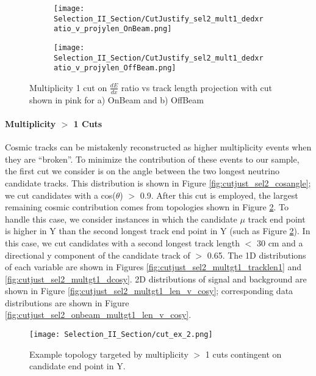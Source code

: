 \begin{figure}[t!]
\centering
\begin{subfigure}[t]{0.25\textwidth}
  \centering
  \texttt{[image: Selection\_II\_Section/CutJustify\_sel2\_mult1\_dedxratio\_v\_projylen\_OnBeam.png]}  
  \caption{ }
  \end{subfigure} 
  \hspace{1 mm}
  \begin{subfigure}[t]{0.25\textwidth}
    \centering
\texttt{[image: Selection\_II\_Section/CutJustify\_sel2\_mult1\_dedxratio\_v\_projylen\_OffBeam.png]}
  \caption{ }
  \end{subfigure} 
\caption{Multiplicity 1 cut on $\frac{dE}{dx}$ ratio vs track length projection with cut shown in pink for a) OnBeam and b) OffBeam }
\label{fig:cutjust_sel2_onbeam_mult1_dedxratio_v_leny}

\end{figure}

\clearpage
\paragraph{Multiplicity $>$ 1 Cuts}
Cosmic tracks can be mistakenly reconstructed as higher multiplicity events when they are ``broken''. To minimize the contribution of these events to our sample, the first cut we consider is on the angle between the two longest neutrino candidate tracks.  This distribution is shown in Figure \ref{fig:cutjust_sel2_cosangle}; we cut candidates with a cos($\theta$) $>$ 0.9.  After this cut is employed, the largest remaining cosmic contribution comes from topologies shown in Figure \ref{fig:cut_ex_2}.  To handle this case, we consider instances in which the candidate $\mu$ track end point is higher in Y than the second longest track end point in Y (such as Figure \ref{fig:cut_ex_2}).  In this case, we cut candidates with a second longest track length $<$ 30 cm and a directional y component of the candidate track of $>$ 0.65. The 1D distributions of each variable are shown in Figures \ref{fig:cutjust_sel2_multgt1_tracklen1} and \ref{fig:cutjust_sel2_multgt1_dcosy}.  2D distributions of signal and background are shown in Figure \ref{fig:cutjust_sel2_multgt1_len_v_cosy}; corresponding data distributions are shown in Figure \ref{fig:cutjust_sel2_onbeam_multgt1_len_v_cosy}. 

\begin{figure}[t!]
  \centering
  \texttt{[image: Selection\_II\_Section/cut\_ex\_2.png]}
  \caption{ Example topology targeted by multiplicity $>$ 1 cuts contingent on candidate end point in Y. }
\label{fig:cut_ex_2}
\end{figure}

